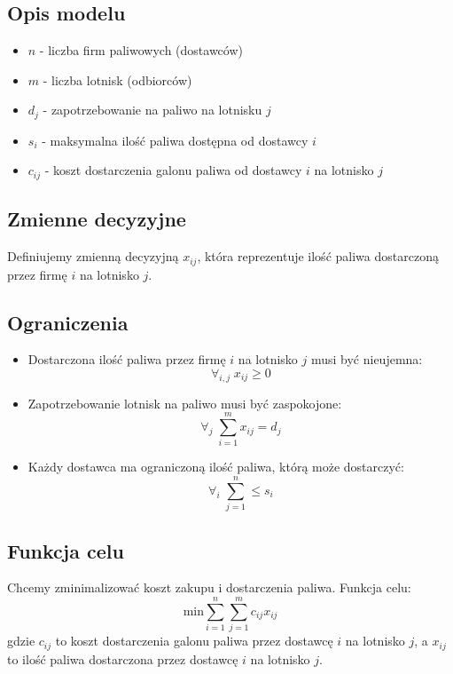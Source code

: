 \documentclass{article}
\begin{document}
\subsection{Opis modelu}
\begin{itemize}
    \item $n$ - liczba firm paliwowych (dostawców)
    \item $m$  - liczba lotnisk (odbiorców)
    \item $d_j$ - zapotrzebowanie na paliwo na lotnisku $j$
    \item $s_i$ - maksymalna ilość paliwa dostępna od dostawcy $i$
    \item $c_{ij}$ - koszt dostarczenia galonu paliwa od dostawcy $i$ na lotnisko $j$
\end{itemize}
\subsection{Zmienne decyzyjne}
Definiujemy zmienną decyzyjną $x_{ij}$, która reprezentuje ilość paliwa dostarczoną przez firmę $i$ na lotnisko $j$.
\subsection{Ograniczenia}
\begin{itemize}
    \item Dostarczona ilość paliwa przez firmę $i$ na lotnisko $j$ musi być nieujemna: 
    \[\forall_{i, j} \; x_{ij} \geq 0\]
    \item Zapotrzebowanie lotnisk na paliwo musi być zaspokojone:
    \[\forall_{j} \; \sum_{i=1}^m x_{ij} = d_j\]
    \item Każdy dostawca ma ograniczoną ilość paliwa, którą może dostarczyć:
    \[\forall_{i} \;\sum_{j=1}^n \leq s_i\]
\end{itemize}
\subsection{Funkcja celu}
Chcemy zminimalizować koszt zakupu i dostarczenia paliwa. Funkcja celu:
\[\text{min} \sum_{i=1}^n \sum_{j=1}^m c_{ij}x_{ij}\]gdzie $c_{ij}$ to koszt dostarczenia galonu paliwa przez dostawcę $i$ na lotnisko $j$, a $x_{ij}$ to ilość paliwa dostarczona przez dostawcę $i$ na lotnisko $j$.
\end{document}
